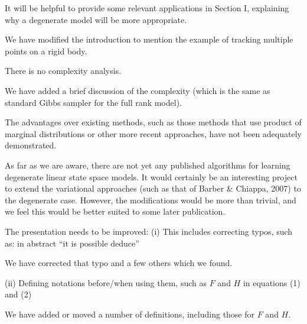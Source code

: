 \documentclass{article}
\newenvironment{review}[0]{\begin{itshape}\color{Gray}\noindent}{\end{itshape}\vspace{0.4cm}}
\newenvironment{response}[0]{\noindent}{\vspace{0.4cm}}
\begin{document}
\begin{review}
It will be helpful to provide some relevant applications in Section I, explaining why a degenerate model will be more appropriate.
\end{review}

\begin{response}
We have modified the introduction to mention the example of tracking multiple points on a rigid body.
\end{response}

\begin{review}
There is no complexity analysis.
\end{review}

\begin{response}
We have added a brief discussion of the complexity (which is the same as standard Gibbs sampler for the full rank model).
\end{response}

\begin{review}
The advantages over existing methods, such as those methods that use product of marginal distributions or other more recent approaches, have not been adequately demonstrated.
\end{review}

\begin{response}
 As far as we are aware, there are not yet any published algorithms for learning degenerate linear state space models. It would certainly be an interesting project to extend the variational approaches (such as that of Barber \& Chiappa, 2007) to the degenerate case. However, the modifications would be more than trivial, and we feel this would be better suited to some later publication.
\end{response}

\begin{review}
The presentation needs to be improved:
(i) This includes correcting typos, such as: in abstract ``it is possible deduce''
\end{review}

\begin{response}
 We have corrected that typo and a few others which we found.
\end{response}

\begin{review}
(ii) Defining notations before/when using them, such as $F$ and $H$ in equations (1) and (2)
\end{review}

\begin{response}
 We have added or moved a number of definitions, including those for $F$ and $H$.
\end{response}
\end{document}

